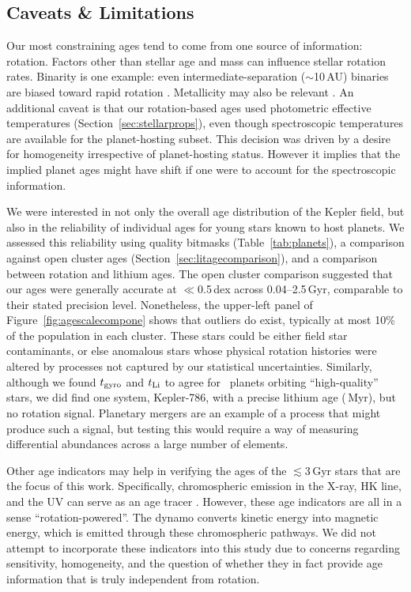\documentclass[11pt,twocolumn,tighten]{aastex63}
\begin{document}
\subsection{Caveats \& Limitations}

Our most constraining ages tend to come from one source of
information: rotation.  Factors other than stellar age and mass can
influence stellar rotation rates.  Binarity is one example: even
intermediate-separation ($\sim$10\,AU) binaries are biased toward
rapid rotation \citep[e.g.][and many studies thereafter]{Meibom_2007}.
Metallicity may also be relevant
\citep{2020MNRAS.499.3481A,2024arXiv240500779S}.  An additional caveat
is that our rotation-based ages used photometric effective
temperatures (Section~\ref{sec:stellarprops}), even though
spectroscopic temperatures are available for the planet-hosting
subset.  This decision was driven by a desire for homogeneity 
irrespective of planet-hosting status.  However it implies that the
implied planet ages might have shift if one were to account for the
spectroscopic information.

We were interested in not only the overall age distribution of the
Kepler field, but also in the reliability of individual ages for young
stars known to host planets.  We assessed this reliability using
quality bitmasks (Table~\ref{tab:planets}), a comparison against open
cluster ages (Section~\ref{sec:litagecomparison}), and a comparison
between rotation and lithium ages.  The open cluster comparison
suggested that our ages were generally accurate at $\ll$0.5\,dex
across 0.04--2.5\,Gyr, comparable to their stated precision level.
Nonetheless, the upper-left panel of Figure~\ref{fig:agescalecompone}
shows that outliers do exist, typically at most 10\% of the population
in each cluster.  These stars could be either field star contaminants,
or else anomalous stars whose physical rotation histories were altered
by processes not captured by our statistical uncertainties.
Similarly, although we found $t_{\rm gyro}$ and $t_{\rm Li}$ to agree
for \ltonegyrhighqconfirmedtwosided\ planets orbiting ``high-quality''
stars, we did find one system, Kepler-786, with a precise lithium age
(\kepseveneightsix\,Myr), but no rotation signal.  Planetary mergers
are an example of a process that might produce such a signal, but
testing this would require a way of measuring differential abundances
across a large number of elements.

Other age indicators may help in verifying the ages of the
$\lesssim$3\,Gyr stars that are the focus of this work.  Specifically,
chromospheric emission in the X-ray,  HK line, and the UV
can serve as an age tracer
\citep{Mamajek_2008,2014MNRAS.441.2361V,2024ApJ...960...62E}.
However, these age indicators are all in a sense ``rotation-powered''.
The dynamo converts kinetic energy into magnetic energy, which is
emitted through these chromospheric pathways.  We did not attempt to
incorporate these indicators into this study due to concerns regarding
sensitivity, homogeneity, and the question of whether they in fact
provide age information that is truly independent from rotation.
\end{document}
